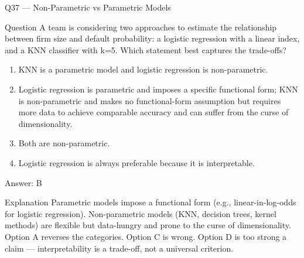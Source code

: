 \documentclass[aspectratio=169,8pt]{beamer}
\begin{document}
	\begin{frame}{Q37 --- Non-Parametric vs Parametric Models}
		\begin{block}{Question}
			A team is considering two approaches to estimate the relationship between firm size and default probability: a logistic regression with a linear index, and a KNN classifier with k=5. Which statement best captures the trade-offs?
		\end{block}
		\begin{enumerate}
			\item KNN is a parametric model and logistic regression is non-parametric.
			\item Logistic regression is parametric and imposes a specific functional form; KNN is non-parametric and makes no functional-form assumption but requires more data to achieve comparable accuracy and can suffer from the curse of dimensionality.
			\item Both are non-parametric.
			\item Logistic regression is always preferable because it is interpretable.
		\end{enumerate}
		\begin{exampleblock}{Answer: B}\end{exampleblock}
		\begin{block}{Explanation}
			Parametric models impose a functional form (e.g., linear-in-log-odds for logistic regression). Non-parametric models (KNN, decision trees, kernel methods) are flexible but data-hungry and prone to the curse of dimensionality. Option A reverses the categories. Option C is wrong. Option D is too strong a claim --- interpretability is a trade-off, not a universal criterion.
		\end{block}
	\end{frame}
	
\end{document}
